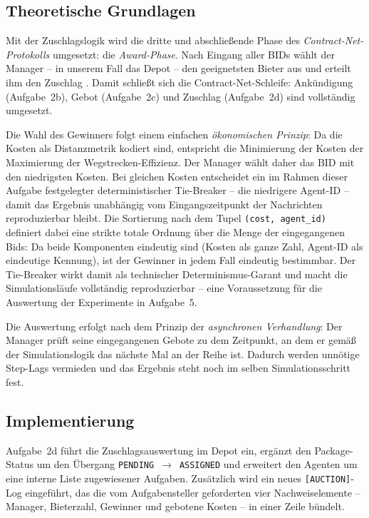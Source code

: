 \subsection{Theoretische Grundlagen}

Mit der Zuschlagslogik wird die dritte und abschließende Phase des \textit{Contract-Net-Protokolls} umgesetzt: die \textit{Award-Phase}. Nach Eingang aller BIDs wählt der Manager -- in unserem Fall das Depot -- den geeignetsten Bieter aus und erteilt ihm den Zuschlag \cite[S. 30\,f.]{5}. Damit schließt sich die Contract-Net-Schleife: Ankündigung (Aufgabe~2b), Gebot (Aufgabe~2c) und Zuschlag (Aufgabe~2d) sind vollständig umgesetzt.

Die Wahl des Gewinners folgt einem einfachen \textit{ökonomischen Prinzip}: Da die Kosten als Distanzmetrik kodiert sind, entspricht die Minimierung der Kosten der Maximierung der Wegstrecken-Effizienz. Der Manager wählt daher das BID mit den niedrigsten Kosten. Bei gleichen Kosten entscheidet ein im Rahmen dieser Aufgabe festgelegter deterministischer Tie-Breaker -- die niedrigere Agent-ID -- damit das Ergebnis unabhängig vom Eingangszeitpunkt der Nachrichten reproduzierbar bleibt. Die Sortierung nach dem Tupel \texttt{(cost, agent\_id)} definiert dabei eine strikte totale Ordnung über die Menge der eingegangenen Bids: Da beide Komponenten eindeutig sind (Kosten als ganze Zahl, Agent-ID als eindeutige Kennung), ist der Gewinner in jedem Fall eindeutig bestimmbar. Der Tie-Breaker wirkt damit als technischer Determinismus-Garant und macht die Simulationsläufe vollständig reproduzierbar -- eine Voraussetzung für die Auswertung der Experimente in Aufgabe~5.

Die Auswertung erfolgt nach dem Prinzip der \textit{asynchronen Verhandlung}: Der Manager prüft seine eingegangenen Gebote zu dem Zeitpunkt, an dem er gemäß der Simulationslogik das nächste Mal an der Reihe ist. Dadurch werden unnötige Step-Lags vermieden und das Ergebnis steht noch im selben Simulationsschritt fest.

\subsection{Implementierung}

Aufgabe~2d führt die Zuschlagsauswertung im Depot ein, ergänzt den Package-Status um den Übergang \texttt{PENDING}~\(\to\)~\texttt{ASSIGNED} und erweitert den Agenten um eine interne Liste zugewiesener Aufgaben. Zusätzlich wird ein neues \texttt{[AUCTION]}-Log eingeführt, das die vom Aufgabensteller geforderten vier Nachweiselemente -- Manager, Bieterzahl, Gewinner und gebotene Kosten -- in einer Zeile bündelt.

